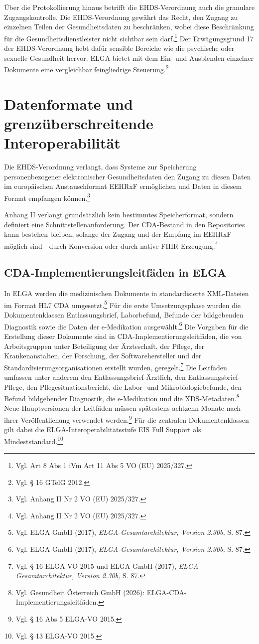 Über die Protokollierung hinaus betrifft die EHDS-Verordnung auch die granulare Zugangskontrolle. Die EHDS-Verordnung gewährt das Recht, den Zugang zu einzelnen Teilen der Gesundheitsdaten zu beschränken, wobei diese Beschränkung für die Gesundheitsdienstleister nicht sichtbar sein darf.\footnote{Vgl. Art 8 Abs 1 iVm Art 11 Abs 5 VO (EU) 2025/327.} Der Erwägungsgrund 17 der EHDS-Verordnung hebt dafür sensible Bereiche wie die psychische oder sexuelle Gesundheit hervor. ELGA bietet mit dem Ein- und Ausblenden einzelner Dokumente eine vergleichbar feingliedrige Steuerung.\footnote{Vgl. § 16 GTelG 2012.}


\section{Datenformate und grenzüberschreitende Interoperabilität}
Die EHDS-Verordnung verlangt, dass Systeme zur Speicherung personenbezogener elektronischer Gesundheitsdaten den Zugang zu diesen Daten im europäischen Austauschformat EEHRxF ermöglichen und Daten in diesem Format empfangen können.\footnote{Vgl. Anhang II Nr 2 VO (EU) 2025/327.}

Anhang II verlangt grundsätzlich kein bestimmtes Speicherformat, sondern definiert eine Schnittstellenanforderung. Der CDA-Bestand in den Repositories kann bestehen bleiben, solange der Zugang und der Empfang im EEHRxF möglich sind - durch Konversion oder durch native FHIR-Erzeugung.\footnote{Vgl. Anhang II Nr 2 VO (EU) 2025/327.}

    \subsection{CDA-Implementierungsleitfäden in ELGA}
In ELGA werden die medizinischen Dokumente in standardisierte XML-Dateien im Format HL7 CDA umgesetzt.\footnote{Vgl.  ELGA GmbH (2017), \textit{ELGA-Gesamtarchitektur, Version 2.30b,} S. 87.} Für die erste Umsetzungsphase wurden die Dokumentenklassen Entlassungsbrief, Laborbefund, Befunde der bildgebenden Diagnostik sowie die Daten der e-Medikation ausgewählt.\footnote{Vgl.  ELGA GmbH (2017), \textit{ELGA-Gesamtarchitektur, Version 2.30b,} S. 87.} Die Vorgaben für die Erstellung dieser Dokumente sind in CDA-Implementierungsleitfäden, die von Arbeitsgruppen unter Beteiligung der Ärzteschaft, der Pflege, der Krankenanstalten, der Forschung, der Softwarehersteller und der Standardisierungsorganisationen erstellt wurden, geregelt.\footnote{Vgl. § 16  ELGA-VO 2015 und ELGA GmbH (2017), \textit{ELGA-Gesamtarchitektur, Version 2.30b,} S. 87.} Die Leitfäden umfassen unter anderem den Entlassungsbrief-Ärztlich, den Entlassungsbrief-Pflege, den Pflegesituationsbericht, die Labor- und Mikrobiologiebefunde, den Befund bildgebender Diagnostik, die e-Medikation und die XDS-Metadaten.\footnote{Vgl. Gesundheit Österreich GmbH (2026): ELGA-CDA-Implementierungsleitfäden.} Neue Hauptversionen der Leitfäden müssen spätestens achtzehn Monate nach ihrer Veröffentlichung verwendet werden.\footnote{Vgl. § 16 Abs 5 ELGA-VO 2015.} Für die zentralen Dokumentenklassen gilt dabei die ELGA-Interoperabilitätsstufe \glqq EIS Full Support\grqq{} als Mindeststandard.\footnote{Vgl. § 13 ELGA-VO 2015.}

